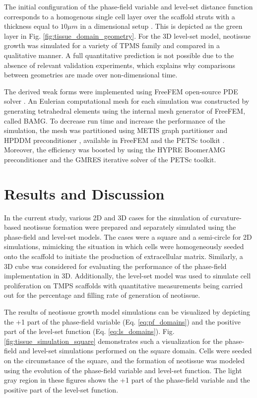 The initial configuration of the phase-field variable and level-set distance function corresponds to a homogenous single cell layer over the scaffold struts with a thickness equal to $10 \mu m$ in a dimensional setup \cite{Darling2008}. This is depicted as the green layer in Fig. \ref{fig:tissue_domain_geometry}. For the 3D level-set model, neotissue growth was simulated for a variety of \gls{TPMS} family and compared in a qualitative manner. A full quantitative prediction is not possible due to the absence of relevant validation experiments, which explains why comparisons between geometries are made over non-dimensional time.

The derived weak forms were implemented using FreeFEM open-source \gls{PDE} solver \cite{Hecht2012}. An Eulerian computational mesh for each simulation was constructed by generating tetrahedral elements using the internal mesh generator of FreeFEM, called BAMG. To decrease run time and increase the performance of the simulation, the mesh was partitioned using  METIS graph partitioner \cite{METIS1998} and \gls{HPDDM} preconditioner \cite{Jolivet2013}, available in FreeFEM and the \gls{PETSc} toolkit \cite{petsc}. Moreover, the efficiency was boosted by using the HYPRE BoomerAMG preconditioner \cite{Falgout2002} and the \gls{GMRES} iterative solver \cite{Saad1986} of the \gls{PETSc} toolkit.


\section{Results and Discussion}

In the current study, various 2D and 3D cases for the simulation of curvature-based neotissue formation were prepared and separately simulated using the phase-field and level-set models. The cases were a square and a semi-circle for 2D simulations, mimicking the situation in which cells were homogeneously seeded onto the scaffold to initiate the production of extracellular matrix. Similarly, a 3D cube was considered for evaluating the performance of the phase-field implementation in 3D. Additionally, the level-set model was used to simulate cell proliferation on TMPS scaffolds with quantitative measurements being carried out for the percentage and filling rate of generation of neotissue.

The results of neotissue growth model simulations can be visualized by depicting the +1 part of the phase-field variable (Eq. \ref{eq:pf_domains}) and the positive part of the level-set function (Eq. \ref{eq:ls_domains}). Fig. \ref{fig:tissue_simulation_square} demonstrates such a visualization for the phase-field and level-set simulations performed on the square domain. Cells were seeded on the circumstance of the square, and the formation of neotissue was modeled using the evolution of the phase-field variable and level-set function. The light gray region in these figures shows the +1 part of the phase-field variable and the positive part of the level-set function.

